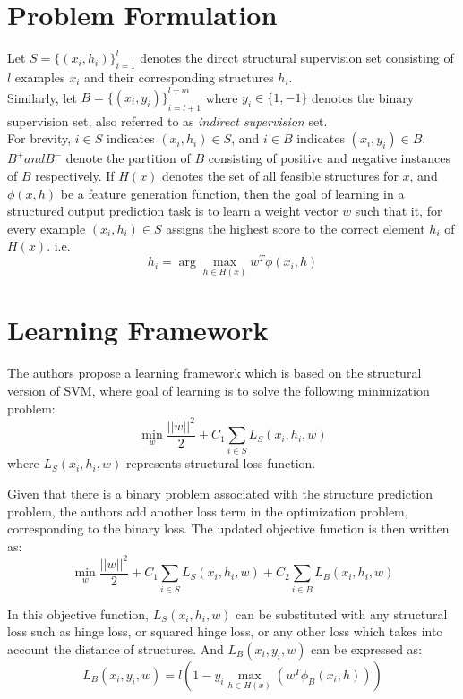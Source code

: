 \documentclass{acm_proc_article-sp}
\begin{document}
\section{Problem Formulation}
\label{sec:problem}
Let $S = {\{(x_i,h_i)\}}_{i=1}^l$ denotes the direct structural supervision set consisting of $l$ examples $x_i$ and their corresponding structures $h_i$.\\ Similarly, let $B = {\{(x_i,y_i)\}}_{i=l+1}^{l+m}$ where $y_i \in \{1,-1\}$ denotes the binary supervision set, also referred to as \textit{indirect supervision} set.\\ For brevity, $i \in S$ indicates $(x_i,h_i) \in S$, and $i \in B$ indicates $(x_i,y_i) \in B$. $B^+ and B^-$ denote the partition of $B$ consisting of positive and negative instances of $B$ respectively. If $H(x)$ denotes the set of all feasible structures for $x$, and $\phi(x,h)$ be a feature generation function, then the goal of learning in a structured output prediction task is to learn a weight vector $w$ such that it, for every example $(x_i,h_i) \in S$ assigns the highest score to the correct element $h_i$ of $H(x)$. i.e.\\
\begin{equation}
h_i = \arg \max_{h \in H(x)} w^T \phi(x_i,h)
\end{equation} 


\section{Learning Framework}
\label{sec:framework}
The authors propose a learning framework which is based on the structural version of SVM, where goal of learning is to solve the following minimization problem:
\begin{equation}
\label{eq:svm-objective}
\min_w \frac{||w||^2}{2} + C_1\sum_{i \in S} L_S(x_i,h_i,w)
\end{equation}
where $L_S(x_i,h_i,w)$ represents structural loss function.

Given that there is a binary problem associated with the structure prediction problem, the authors add another loss term in the optimization problem, corresponding to the binary loss. The updated objective function is then written as:
\begin{equation}
\label{eq:jlis-objective}
\min_w \frac{||w||^2}{2} + C_1\sum_{i \in S} L_S(x_i,h_i,w) + C_2\sum_{i \in B} L_B(x_i,h_i,w)
\end{equation}

In this objective function, $L_S(x_i,h_i,w)$ can be substituted with any structural loss such as hinge loss, or squared hinge loss, or any other loss which takes into account the distance of structures. And $L_B(x_i,y_i,w)$ can be expressed as:
\begin{equation}
L_B(x_i,y_i,w) = l \left( 1-y_i \max_{h \in H(x)} (w^T \phi_B(x_i,h)) \right)
\end{equation}
\end{document}
